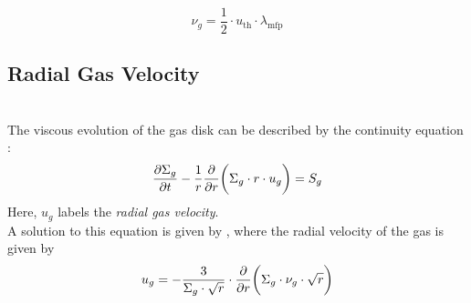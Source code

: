         \begin{equation}
            \nu_g = \frac{1}{2} \cdot u_\text{th} \cdot \lambda_\text{mfp}
        \end{equation}

        

    \newpage\subsection{Radial Gas Velocity}

         \\

        The viscous evolution of the gas disk can be described by the continuity equation 
        \cite{birnstiel_dullemond_brauer_2010}:
        \begin{equation}
            \frac{\partial \Sigma_g}{\partial t}-\frac{1}{r}\frac{\partial }{\partial r}\bigg(\Sigma_g \cdot r \cdot u_g\bigg) = S_g
        \end{equation}
        Here, $u_g$ labels the \textit{radial gas velocity}.
        \\

        A solution to this equation is given by \cite{lynden-bell_pringle_1974}, where the 
        radial velocity of the gas is given by
        \begin{equation}
            u_{g}
            =-\frac{3}{\Sigma_g\cdot\sqrt{r}}
                \cdot\frac{\partial }{\partial r}\bigg(\Sigma_g \cdot \nu_g \cdot \sqrt{r}\bigg)
        \end{equation}

        


